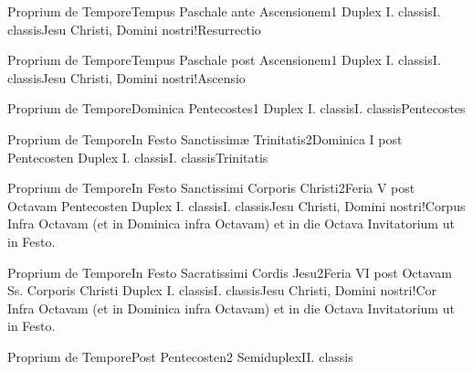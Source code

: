 \documentclass[nocturnale-romanum.tex]{subfiles}
\begin{document}
	{Proprium de Tempore}{Tempus Paschale ante Ascensionem}{1}{}
	{Duplex I. classis}{I. classis}{Jesu Christi, Domini nostri!Resurrectio}
	{}
	{}

	{Proprium de Tempore}{Tempus Paschale post Ascensionem}{1}{}
	{Duplex I. classis}{I. classis}{Jesu Christi, Domini nostri!Ascensio}
	{}
	{}


	{Proprium de Tempore}{Dominica Pentecostes}{1}{}
	{Duplex I. classis}{I. classis}{Pentecostes}
	{}
	{}


	{Proprium de Tempore}{In Festo Sanctissimæ Trinitatis}{2}{Dominica I post Pentecosten}
	{Duplex I. classis}{I. classis}{Trinitatis}
	{}
	{}


	{Proprium de Tempore}{In Festo Sanctissimi Corporis Christi}{2}{Feria V post Octavam Pentecosten}
	{Duplex I. classis}{I. classis}{Jesu Christi, Domini nostri!Corpus}
	{Infra Octavam (et in Dominica infra Octavam) et in die Octava Invitatorium ut in Festo.}
	{}

	{Proprium de Tempore}{In Festo Sacratissimi Cordis Jesu}{2}{Feria VI post Octavam Ss. Corporis Christi}
	{Duplex I. classis}{I. classis}{Jesu Christi, Domini nostri!Cor}
	{Infra Octavam (et in Dominica infra Octavam) et in die Octava Invitatorium ut in Festo.}
	{}

	{Proprium de Tempore}{Post Pentecosten}{2}{}
	{Semiduplex}{II. classis}{}
	{}
	{}
\end{document}
